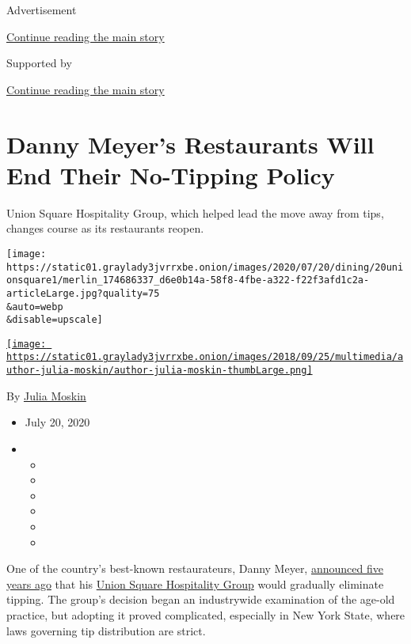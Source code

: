 Advertisement

\protect\hyperlink{after-top}{Continue reading the main story}

Supported by

\protect\hyperlink{after-sponsor}{Continue reading the main story}

\hypertarget{danny-meyers-restaurants-will-end-their-no-tipping-policy}{%
\section{Danny Meyer's Restaurants Will End Their No-Tipping
Policy}\label{danny-meyers-restaurants-will-end-their-no-tipping-policy}}

Union Square Hospitality Group, which helped lead the move away from
tips, changes course as its restaurants reopen.

\texttt{[image: https://static01.graylady3jvrrxbe.onion/images/2020/07/20/dining/20unionsquare1/merlin\_174686337\_d6e0b14a-58f8-4fbe-a322-f22f3afd1c2a-articleLarge.jpg?quality=75\\\&auto=webp\\\&disable=upscale]}

\href{https://www.nytimes3xbfgragh.onion/by/julia-moskin}{\texttt{[image: https://static01.graylady3jvrrxbe.onion/images/2018/09/25/multimedia/author-julia-moskin/author-julia-moskin-thumbLarge.png]}}

By \href{https://www.nytimes3xbfgragh.onion/by/julia-moskin}{Julia
Moskin}

\begin{itemize}
\item
  July 20, 2020
\item
  \begin{itemize}
  \item
  \item
  \item
  \item
  \item
  \item
  \end{itemize}
\end{itemize}

One of the country's best-known restaurateurs, Danny Meyer,
\href{https://www.nytimes3xbfgragh.onion/2015/10/15/dining/danny-meyer-restaurants-no-tips.html}{announced
five years ago} that his \href{https://www.ushgnyc.com/}{Union Square
Hospitality Group} would gradually eliminate tipping. The group's
decision began an industrywide examination of the age-old practice, but
adopting it proved complicated, especially in New York State, where laws
governing tip distribution are strict.

